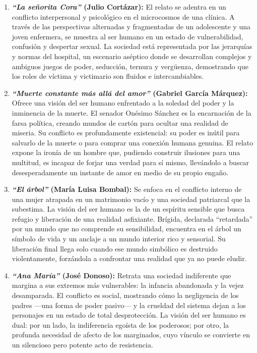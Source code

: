 \documentclass[12pt, letterpaper]{article}
\begin{document}
\begin{enumerate}[label=\arabic*., wide, labelindent=0pt]
	\item \textbf{\textit{``La señorita Cora''} (Julio Cortázar):} El relato se adentra en un conflicto interpersonal y psicológico en el microcosmos de una clínica. A través de las perspectivas alternadas y fragmentadas de un adolescente y una joven enfermera, se muestra al ser humano en un estado de vulnerabilidad, confusión y despertar sexual. La sociedad está representada por las jerarquías y normas del hospital, un escenario aséptico donde se desarrollan complejos y ambiguos juegos de poder, seducción, ternura y vergüenza, demostrando que los roles de víctima y victimario son fluidos e intercambiables.

	\item \textbf{\textit{``Muerte constante más allá del amor''} (Gabriel García Márquez):} Ofrece una visión del ser humano enfrentado a la soledad del poder y la inminencia de la muerte. El senador Onésimo Sánchez es la encarnación de la farsa política, creando mundos de cartón para ocultar una realidad de miseria. Su conflicto es profundamente existencial: su poder es inútil para salvarlo de la muerte o para comprar una conexión humana genuina. El relato expone la ironía de un hombre que, pudiendo construir ilusiones para una multitud, es incapaz de forjar una verdad para sí mismo, llevándolo a buscar desesperadamente un instante de amor en medio de su propio engaño.

	\item \textbf{\textit{``El árbol''} (María Luisa Bombal):} Se enfoca en el conflicto interno de una mujer atrapada en un matrimonio vacío y una sociedad patriarcal que la subestima. La visión del ser humano es la de un espíritu sensible que busca refugio y liberación de una realidad asfixiante. Brígida, declarada ``retardada'' por un mundo que no comprende su sensibilidad, encuentra en el árbol un símbolo de vida y un anclaje a un mundo interior rico y sensorial. Su liberación final llega solo cuando ese mundo simbólico es destruido violentamente, forzándola a confrontar una realidad que ya no puede eludir.

	\item \textbf{\textit{``Ana María''} (José Donoso):} Retrata una sociedad indiferente que margina a sus extremos más vulnerables: la infancia abandonada y la vejez desamparada. El conflicto es social, mostrando cómo la negligencia de los padres —una forma de poder pasivo— y la crueldad del sistema dejan a los personajes en un estado de total desprotección. La visión del ser humano es dual: por un lado, la indiferencia egoísta de los poderosos; por otro, la profunda necesidad de afecto de los marginados, cuyo vínculo se convierte en un silencioso pero potente acto de resistencia.


\end{enumerate}
\end{document}
